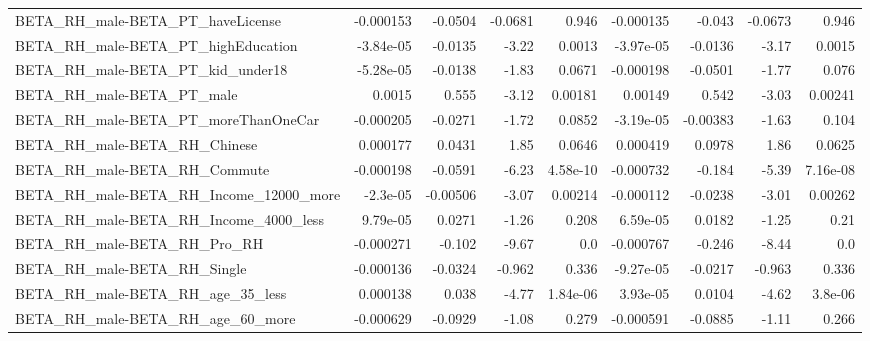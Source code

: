 \begin{tabular}{lrrrrrrrr}
BETA\_RH\_male-BETA\_PT\_haveLicense                   &   -0.000153 &      -0.0504 &   -0.0681 &    0.946 &  -0.000135 &      -0.043 &      -0.0673 &         0.946 \\
BETA\_RH\_male-BETA\_PT\_highEducation                 &   -3.84e-05 &      -0.0135 &     -3.22 &   0.0013 &  -3.97e-05 &     -0.0136 &        -3.17 &        0.0015 \\
BETA\_RH\_male-BETA\_PT\_kid\_under18                   &   -5.28e-05 &      -0.0138 &     -1.83 &   0.0671 &  -0.000198 &     -0.0501 &        -1.77 &         0.076 \\
BETA\_RH\_male-BETA\_PT\_male                          &      0.0015 &        0.555 &     -3.12 &  0.00181 &    0.00149 &       0.542 &        -3.03 &       0.00241 \\
BETA\_RH\_male-BETA\_PT\_moreThanOneCar                &   -0.000205 &      -0.0271 &     -1.72 &   0.0852 &  -3.19e-05 &    -0.00383 &        -1.63 &         0.104 \\
BETA\_RH\_male-BETA\_RH\_Chinese                       &    0.000177 &       0.0431 &      1.85 &   0.0646 &   0.000419 &      0.0978 &         1.86 &        0.0625 \\
BETA\_RH\_male-BETA\_RH\_Commute                       &   -0.000198 &      -0.0591 &     -6.23 & 4.58e-10 &  -0.000732 &      -0.184 &        -5.39 &      7.16e-08 \\
BETA\_RH\_male-BETA\_RH\_Income\_12000\_more             &    -2.3e-05 &     -0.00506 &     -3.07 &  0.00214 &  -0.000112 &     -0.0238 &        -3.01 &       0.00262 \\
BETA\_RH\_male-BETA\_RH\_Income\_4000\_less              &    9.79e-05 &       0.0271 &     -1.26 &    0.208 &   6.59e-05 &      0.0182 &        -1.25 &          0.21 \\
BETA\_RH\_male-BETA\_RH\_Pro\_RH                        &   -0.000271 &       -0.102 &     -9.67 &      0.0 &  -0.000767 &      -0.246 &        -8.44 &           0.0 \\
BETA\_RH\_male-BETA\_RH\_Single                        &   -0.000136 &      -0.0324 &    -0.962 &    0.336 &  -9.27e-05 &     -0.0217 &       -0.963 &         0.336 \\
BETA\_RH\_male-BETA\_RH\_age\_35\_less                   &    0.000138 &        0.038 &     -4.77 & 1.84e-06 &   3.93e-05 &      0.0104 &        -4.62 &       3.8e-06 \\
BETA\_RH\_male-BETA\_RH\_age\_60\_more                   &   -0.000629 &      -0.0929 &     -1.08 &    0.279 &  -0.000591 &     -0.0885 &        -1.11 &         0.266 \\

\end{tabular}

